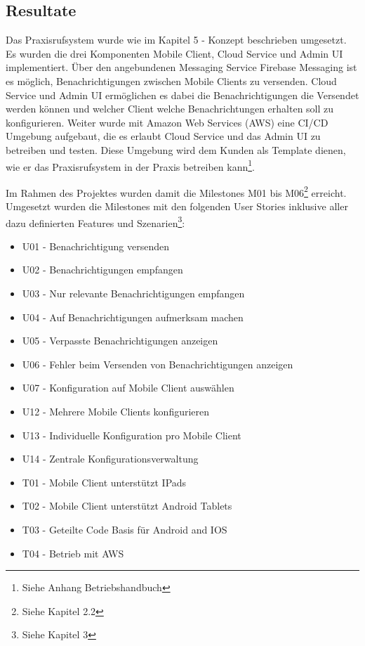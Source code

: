 \subsection{Resultate}

Das Praxisrufsystem wurde wie im Kapitel 5 - Konzept beschrieben umgesetzt.
Es wurden die drei Komponenten Mobile Client, Cloud Service und Admin UI implementiert.
Über den angebundenen Messaging Service Firebase Messaging ist es möglich, Benachrichtigungen zwischen Mobile Clients zu versenden.
Cloud Service und Admin UI ermöglichen es dabei die Benachrichtigungen die Versendet werden können und welcher Client welche Benachrichtungen erhalten soll zu konfigurieren.
Weiter wurde mit Amazon Web Services (AWS) eine CI/CD Umgebung aufgebaut, die es erlaubt Cloud Service und das Admin UI zu betreiben und testen.
Diese Umgebung wird dem Kunden als Template dienen, wie er das Praxisrufsystem in der Praxis betreiben kann\footnote{Siehe Anhang Betriebshandbuch}.

Im Rahmen des Projektes wurden damit die Milestones M01 bis M06\footnote{Siehe Kapitel 2.2} erreicht.
Umgesetzt wurden die Milestones mit den folgenden User Stories inklusive aller dazu definierten Features und Szenarien\footnote{Siehe Kapitel 3}:

\begin{itemize}
    \item U01 - Benachrichtigung versenden
    \item U02 - Benachrichtigungen empfangen
    \item U03 - Nur relevante Benachrichtigungen empfangen
    \item U04 - Auf Benachrichtigungen aufmerksam machen
    \item U05 - Verpasste Benachrichtigungen anzeigen
    \item U06 - Fehler beim Versenden von Benachrichtigungen anzeigen
    \item U07 - Konfiguration auf Mobile Client auswählen
    \item U12 - Mehrere Mobile Clients konfigurieren
    \item U13 - Individuelle Konfiguration pro Mobile Client
    \item U14 - Zentrale Konfigurationsverwaltung
    \item T01 - Mobile Client unterstützt IPads
    \item T02 - Mobile Client unterstützt Android Tablets
    \item T03 - Geteilte Code Basis für Android and IOS
    \item T04 - Betrieb mit AWS
\end{itemize}

